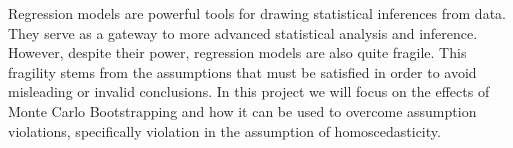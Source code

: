 Regression models are powerful tools for drawing statistical inferences from data. They serve as a gateway to more advanced statistical analysis and inference. However, despite their power, regression models are also quite fragile. This fragility stems from the assumptions that must be satisfied in order to avoid misleading or invalid conclusions. In this project we will focus on the effects of Monte Carlo Bootstrapping and how it can be used to overcome assumption violations, specifically violation in the assumption of homoscedasticity. 